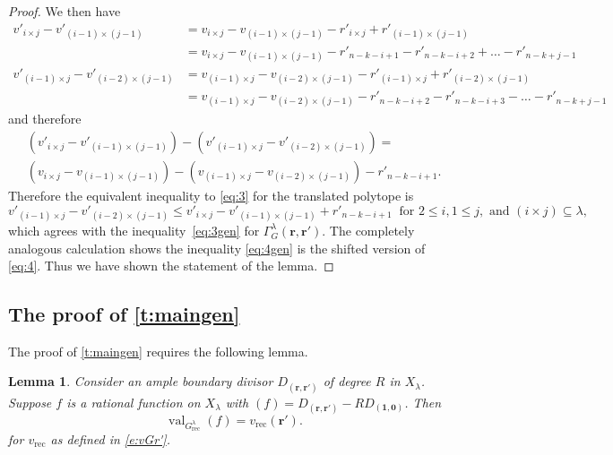 \documentclass{amsart}
\newtheorem{lem}[thm]{Lemma}
\theoremstyle{definition}
\numberwithin{equation}{section}
\newcommand{\rect}{\mathrm{rec}}
\newcommand{\val}{{\operatorname{val}}}
\begin{document}
\begin{proof}
We then have
\begin{equation*}
\begin{array}{ll}
v'_{i \times j}  - v'_{(i-1)\times (j-1)}&=  v_{i \times j}  - v_{(i-1)\times (j-1)} - r'_{i\times j}+r'_{(i-1)\times (j-1)}\\
&=v_{i \times j}  - v_{(i-1)\times (j-1)} -r'_{n-k-i+1}-r'_{n-k-i+2}+\dotsc- r'_{n-k+j-1}\\
v'_{(i-1) \times j}  - v'_{(i-2)\times (j-1)}&=  v_{(i-1) \times j}  - v_{(i-2)\times (j-1)}- r'_{(i-1)\times j}+r'_{(i-2)\times (j-1)}\\
&=v_{(i-1) \times j}  - v_{(i-2)\times (j-1)}- r'_{n-k-i+2}-r'_{n-k-i+3}-\dotsc - r'_{n-k+j-1}
	\end{array}
	\end{equation*}
	and therefore 
	\begin{multline*}
	\left(v'_{i \times j}  - v'_{(i-1)\times (j-1)}\right)-\left(v'_{(i-1) \times j}  - v'_{(i-2)\times (j-1)}\right)=\\
	\left(v_{i \times j}  - v_{(i-1)\times (j-1)}\right)-\left(v_{(i-1) \times j}  - v_{(i-2)\times (j-1)}\right)-r'_{n-k-i+1}.
	\end{multline*}
	Therefore the equivalent inequality to \eqref{eq:3} for the translated polytope is 
	\begin{equation}
	v'_{(i-1)\times j} - v'_{(i-2)\times (j-1)} \leq
v'_{i \times j}  - v'_{(i-1)\times (j-1)}+r'_{n-k-i+1}
\ \text{ for }2 \leq i, 
		1\leq j, \text{ and } (i \times j) \subseteq \lambda, \label{eq:3'}
		\end{equation}
		which agrees with the inequality~\eqref{eq:3gen} for $\Gamma^\lambda_G(\mathbf r,\mathbf r')$. 
		The completely analogous calculation shows the inequality \eqref{eq:4gen} is the shifted version of \eqref{eq:4}. Thus we have shown the statement of the lemma.
\end{proof}




\subsection{The proof of \cref{t:maingen}}\label{s:proof2}
The proof of \cref{t:maingen} requires the following lemma. 
\begin{lem}\label{l:recvaluationf} Consider an ample boundary divisor $D_{(\mathbf r,\mathbf r')}$ of degree $R$ in $X_\lambda$. Suppose $f$ is a rational function on $X_\lambda$ with $(f)=D_{(\mathbf r,\mathbf r')}-R D_{(\mathbf 1,\mathbf 0)}$. Then 
\[\val_{G^\lambda_\rect}(f)=v_\rect(\mathbf r').
\]
for $v_{\rect}$ as defined in \eqref{e:vGr'}.
\end{lem}
\end{document}
